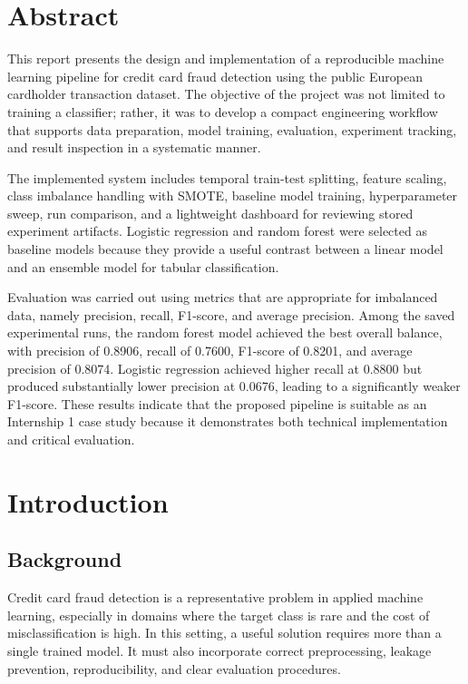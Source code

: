 \documentclass[12pt,a4paper]{report}
\begin{document}
\chapter*{Abstract}
This report presents the design and implementation of a reproducible machine learning pipeline for credit card fraud detection using the public European cardholder transaction dataset. The objective of the project was not limited to training a classifier; rather, it was to develop a compact engineering workflow that supports data preparation, model training, evaluation, experiment tracking, and result inspection in a systematic manner.

The implemented system includes temporal train-test splitting, feature scaling, class imbalance handling with SMOTE, baseline model training, hyperparameter sweep, run comparison, and a lightweight dashboard for reviewing stored experiment artifacts. Logistic regression and random forest were selected as baseline models because they provide a useful contrast between a linear model and an ensemble model for tabular classification.

Evaluation was carried out using metrics that are appropriate for imbalanced data, namely precision, recall, F1-score, and average precision. Among the saved experimental runs, the random forest model achieved the best overall balance, with precision of 0.8906, recall of 0.7600, F1-score of 0.8201, and average precision of 0.8074. Logistic regression achieved higher recall at 0.8800 but produced substantially lower precision at 0.0676, leading to a significantly weaker F1-score. These results indicate that the proposed pipeline is suitable as an Internship 1 case study because it demonstrates both technical implementation and critical evaluation.

\tableofcontents
\clearpage
\listoffigures
\clearpage
\listoftables

\clearpage
{}

\chapter{Introduction}
\section{Background}
Credit card fraud detection is a representative problem in applied machine learning, especially in domains where the target class is rare and the cost of misclassification is high. In this setting, a useful solution requires more than a single trained model. It must also incorporate correct preprocessing, leakage prevention, reproducibility, and clear evaluation procedures.
\end{document}
